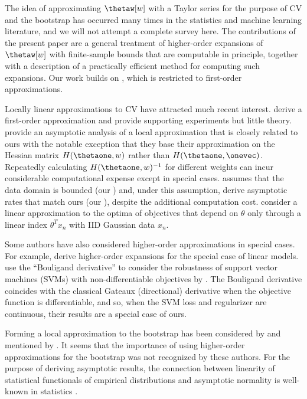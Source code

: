 The idea of approximating $\thetaw[w]$ with a Taylor series for the purpose of
CV and the bootstrap has occurred many times in the statistics and machine
learning literature, and we will not attempt a complete survey here.  The
contributions of the present paper are a general treatment of higher-order
expansions of $\thetaw[w]$ with finite-sample bounds that are computable in
principle, together with a description of a practically efficient method for
computing such expansions. Our work builds on \citet{giordano:2019:ij}, which
is restricted to first-order approximations.

Locally linear approximations to CV have attracted much recent interest.
\citet{koh:2017:blackbox} derive a first-order approximation and provide
supporting experiments but little theory.
\citet{beirami:2017:optimalgeneralizability} provide an asymptotic analysis of a
local approximation that is closely related to ours with the notable exception
that they base their approximation on the Hessian matrix $H(\thetaone, w)$
rather than $H(\thetaone, \onevec)$.  Repeatedly calculating $H(\thetaone,
w)^{-1}$ for different weights can incur considerable computational expense
except in special cases.  \citet{beirami:2017:optimalgeneralizability} assumes
that the data domain is bounded (our ) and, under this
assumption, derive asymptotic rates that match ours (our
), despite the additional computation cost.
\citet{rad:2018:scalableloo} consider a linear approximation to the optima of
objectives that depend on $\theta$ only through a linear index $\theta^T x_n$
with IID Gaussian data $x_n$.

Some authors have also considered higher-order approximations in special cases.
For example, \citet{liu:2014:efficient, debruyne:2008:model} derive higher-order
expansions for the special case of linear models. \citet{liu:2014:efficient} use
the ``Bouligand derivative'' to consider the robustness of support vector
machines (SVMs) with non-differentiable objectives by
\citet{christmann:2008:bouligand}.  The Bouligand derivative coincides with the
classical Gateaux (directional) derivative when the objective function is
differentiable, and so, when the SVM loss and regularizer are continuous, their
results are a special case of ours.

Forming a local approximation to the bootstrap has been considered by
\citet{schulam:2019:trust} and mentioned by
\citet{beirami:2017:optimalgeneralizability}.  It seems that the importance of
using higher-order approximations for the bootstrap was not recognized by these
authors.  For the purpose of deriving asymptotic results, the connection
between linearity of statistical functionals of empirical distributions and
asymptotic normality is well-known in statistics \citep{mises:1947:asymptotic,
fernholz:1983:mises}.

